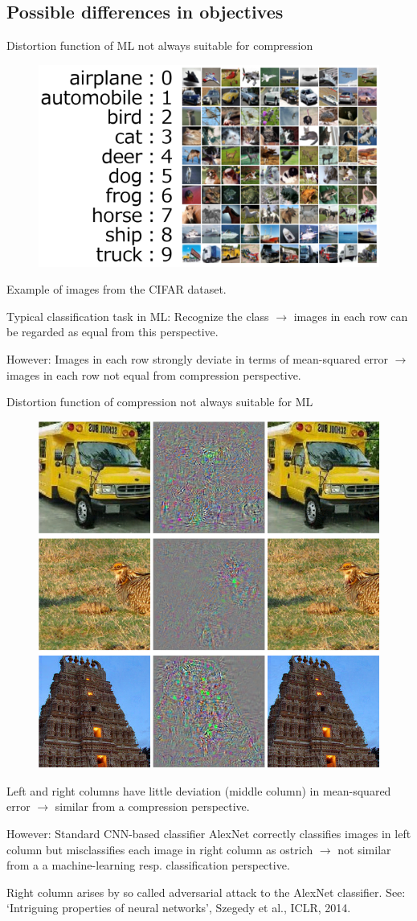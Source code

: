 \subsection{Possible differences in objectives}
\begin{frame}{Distortion function of ML not always suitable for compression }
\begin{figure}
\includegraphics[width=.45\textwidth]{Cifar_2.png}
\end{figure}
\bit
\item Example of images from the CIFAR dataset. \\
\item Typical classification task in ML: Recognize the class $\rightarrow$ images in each row can be regarded as equal from this perspective.
\item However: Images in each row strongly deviate in terms of mean-squared error $\rightarrow$ images in each row not equal from compression perspective. 
\eit
\end{frame}

\begin{frame}{Distortion function of compression not always suitable for ML}
\begin{figure}
\includegraphics[width=.23\textwidth]{Adversarial.png}
\end{figure}
\bit
\item Left and right columns have little deviation (middle column) in mean-squared error $\rightarrow$ similar 
from a compression perspective. \\
\item However: Standard CNN-based classifier AlexNet correctly classifies images in left column but misclassifies each image in right column as ostrich $\rightarrow$ not similar from a
a machine-learning resp. classification perspective.
\item Right column arises by so called adversarial attack to the AlexNet classifier. See: `Intriguing properties of neural networks', Szegedy et al., ICLR, 2014. 
\eit
\end{frame}
